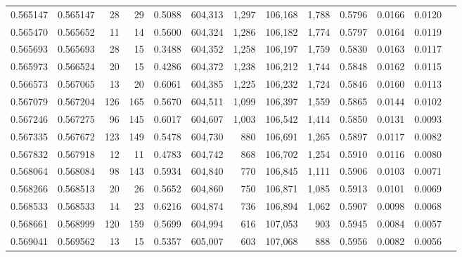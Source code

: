 \begin{tabular}{rrrrrrrrrrrrr}
0.565147 & 0.565147 &    28 &    29 &                                     0.5088 & 604,313 &   1,297 & 106,168 &   1,788 & 0.5796 & 0.0166 & 0.0120 \\
0.565470 & 0.565652 &    11 &    14 &                                     0.5600 & 604,324 &   1,286 & 106,182 &   1,774 & 0.5797 & 0.0164 & 0.0119 \\
0.565693 & 0.565693 &    28 &    15 &                                     0.3488 & 604,352 &   1,258 & 106,197 &   1,759 & 0.5830 & 0.0163 & 0.0117 \\
0.565973 & 0.566524 &    20 &    15 &                                     0.4286 & 604,372 &   1,238 & 106,212 &   1,744 & 0.5848 & 0.0162 & 0.0115 \\
0.566573 & 0.567065 &    13 &    20 &                                     0.6061 & 604,385 &   1,225 & 106,232 &   1,724 & 0.5846 & 0.0160 & 0.0113 \\
0.567079 & 0.567204 &   126 &   165 &                                     0.5670 & 604,511 &   1,099 & 106,397 &   1,559 & 0.5865 & 0.0144 & 0.0102 \\
0.567246 & 0.567275 &    96 &   145 &                                     0.6017 & 604,607 &   1,003 & 106,542 &   1,414 & 0.5850 & 0.0131 & 0.0093 \\
0.567335 & 0.567672 &   123 &   149 &                                     0.5478 & 604,730 &     880 & 106,691 &   1,265 & 0.5897 & 0.0117 & 0.0082 \\
0.567832 & 0.567918 &    12 &    11 &                                     0.4783 & 604,742 &     868 & 106,702 &   1,254 & 0.5910 & 0.0116 & 0.0080 \\
0.568064 & 0.568084 &    98 &   143 &                                     0.5934 & 604,840 &     770 & 106,845 &   1,111 & 0.5906 & 0.0103 & 0.0071 \\
0.568266 & 0.568513 &    20 &    26 &                                     0.5652 & 604,860 &     750 & 106,871 &   1,085 & 0.5913 & 0.0101 & 0.0069 \\
0.568533 & 0.568533 &    14 &    23 &                                     0.6216 & 604,874 &     736 & 106,894 &   1,062 & 0.5907 & 0.0098 & 0.0068 \\
0.568661 & 0.568999 &   120 &   159 &                                     0.5699 & 604,994 &     616 & 107,053 &     903 & 0.5945 & 0.0084 & 0.0057 \\
0.569041 & 0.569562 &    13 &    15 &                                     0.5357 & 605,007 &     603 & 107,068 &     888 & 0.5956 & 0.0082 & 0.0056 \\

\end{tabular}

